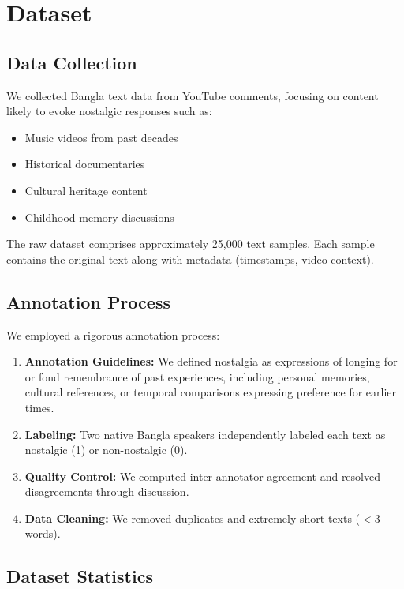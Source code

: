 \documentclass[conference]{IEEEtran}
\begin{document}
\section{Dataset}

\subsection{Data Collection}

We collected Bangla text data from YouTube comments, focusing on content likely to evoke nostalgic responses such as:
\begin{itemize}
\item Music videos from past decades
\item Historical documentaries
\item Cultural heritage content
\item Childhood memory discussions
\end{itemize}

The raw dataset comprises approximately 25,000 text samples. Each sample contains the original text along with metadata (timestamps, video context).

\subsection{Annotation Process}

We employed a rigorous annotation process:
\begin{enumerate}
\item \textbf{Annotation Guidelines:} We defined nostalgia as expressions of longing for or fond remembrance of past experiences, including personal memories, cultural references, or temporal comparisons expressing preference for earlier times.
\item \textbf{Labeling:} Two native Bangla speakers independently labeled each text as nostalgic (1) or non-nostalgic (0).
\item \textbf{Quality Control:} We computed inter-annotator agreement and resolved disagreements through discussion.
\item \textbf{Data Cleaning:} We removed duplicates and extremely short texts ($<$3 words).
\end{enumerate}

\subsection{Dataset Statistics}
\end{document}
